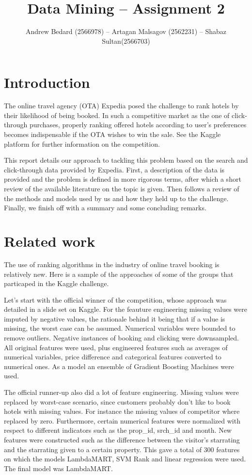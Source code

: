 \documentclass{llncs}
\title{Data Mining -- Assignment 2}
\author{Andrew Bedard (2566978) -- Artagan Malsagov (2562231)  -- Shabaz Sultan(2566703)}
\institute{}
\begin{document}
\maketitle
\section{Introduction}
The online travel agency (OTA) Expedia posed the challenge to rank hotels by their likelihood of being booked. In such a competitive market as the one of click-through purchases, properly ranking offered hotels according to user's preferences becomes indispensable if the OTA wishes to win the sale. See the Kaggle platform \cite{WinNT} for further information on the competition.

This report details our approach to tackling this problem based on the search and click-through data provided by Expedia. First, a description of the data is provided and the problem is defined in more rigorous terms, after which a short review of the available literature on the topic is given. Then follows a review of the methods and models used by us and how they held up to the challenge. Finally, we finish off with a summary and some concluding remarks.  

\section{Related work}
The use of ranking algorithms in the industry of online travel booking is relatively new. Here is a sample of the approaches of some of the groups that particaped in the Kaggle challenge.

Let's start with the official winner of the competition, whose approach was detailed in a slide set on Kaggle. For the feauture engineering missing values were imputed by negative values, the rationale behind it being that if a value is missing, the worst case can be assumed. Numerical variables were bounded to remove outliers. Negative instances of booking and clicking were downsampled. All original features were used, plus engineered features such as averages of numerical variables, price difference and categorical features converted to numerical ones. As a model an ensemble of Gradient Boosting Machines were used. 

The official runner-up also did a lot of feature engineering. Missing values were replaced by worst-case scenario, since customers probably don't like to book hotels with missing values. For instance the missing values of competitor where replaced by zero. Furthermore, certain numerical features were normalized with respect to different indicators such as the prop\_id, srch\_id and month. New features were constructed such as the difference between the visitor's starrating and the starrating given to a certain property. This gave a total of 300 features on which the models LambdaMART, SVM Rank and linear regression were used. The final model was LambdaMART.
\end{document}
